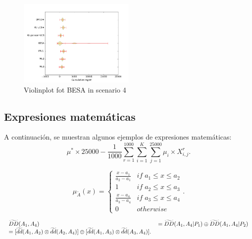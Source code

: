 {{		\begin{figure}
			\centering
			\includegraphics[width=0.5\textwidth]{recursos/Figure2}
			\caption{Violinplot fot BESA in scenario 4}
			\label{fig:violin_besa_escenario4}
		\end{figure}
		
		
		
		\subsection{Expresiones matemáticas}
		A continuación, se muestran algunos ejemplos de expresiones matemáticas:
		\begin{equation}
		\mu^*\times 25000-\frac{1}{1000}\sum_{r=1}^{1000}\sum_{i=1}^{K}\sum_{j=1}^{25000}\mu_i\times X_{i,j}^r.
		\end{equation}
		
		\begin{equation}
		\mu_{\widetilde{A}}(x)=\left\{ \begin{array}{cc}
		\frac{x-a_{1}}{a_{2}-a_{1}} & if\; a_{1}\leq x\leq a_{2}\\
		1 & if\; a_{2}\leq x\leq a_{3}\\
		\frac{x-a_{4}}{a_{3}-a_{4}} & if\; a_{3}\leq x\leq a_{4}\\
		0 & otherwise
		\end{array}\right. .
		\end{equation}
		
		
		\begin{equation}
		\begin{tabular}{ll}
		$\widetilde{DD}(A_{1},A_{4})$ & $=\widetilde{DD}(A_{1},A_{4}|P_{1})\oplus 
		\widetilde{DD}(A_{1},A_{4}|P_{2})$ \\ 
		$=[\widetilde{dd}(A_{1},A_{2})\otimes \widetilde{dd}(A_{2},A_{4})]\oplus \lbrack \widetilde{dd}(A_{1},A_{3})\otimes \widetilde{%
			dd}(A_{3},A_{4})].$%
		\end{tabular}%
		\end{equation}
		
}}
